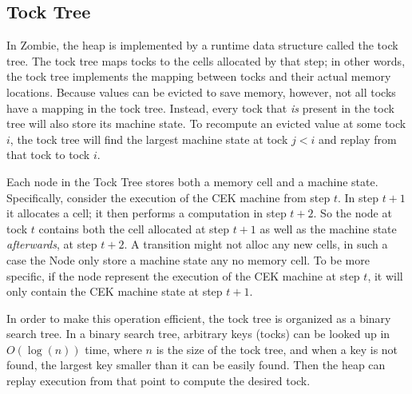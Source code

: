 \subsection{Tock Tree}

In Zombie, the heap is implemented by a runtime data structure called the tock tree. The tock tree maps tocks to the cells allocated by that step; in other words, the tock tree implements the mapping between tocks and their actual memory locations. Because values can be evicted to save memory, however, not all tocks have a mapping in the tock tree. Instead, every tock that \emph{is} present in the tock tree will also store its machine state. To recompute an evicted value at some tock $i$, the tock tree will find the largest machine state at tock $j < i$ and replay from that tock to tock $i$.

Each node in the Tock Tree stores both a memory cell and a machine state. Specifically, consider the execution of the CEK machine from step $t$. In step $t + 1$ it allocates a cell; it then performs a computation in step $t + 2$. So the node at tock $t$ contains both the cell allocated at step $t + 1$ as well as the machine state \emph{afterwards}, at step $t + 2$. A transition might not alloc any new cells, in such a case the Node only store a machine state any no memory cell. To be more specific, if the node represent the execution of the CEK machine at step $t$, it will only contain the CEK machine state at step $t + 1$.

In order to make this operation efficient, the tock tree is organized as a binary search tree. In a binary search tree, arbitrary keys (tocks) can be looked up in $O(\log(n))$ time, where $n$ is the size of the tock tree, and when a key is not found, the largest key smaller than it can be easily found. Then the heap can replay execution from that point to compute the desired tock.

